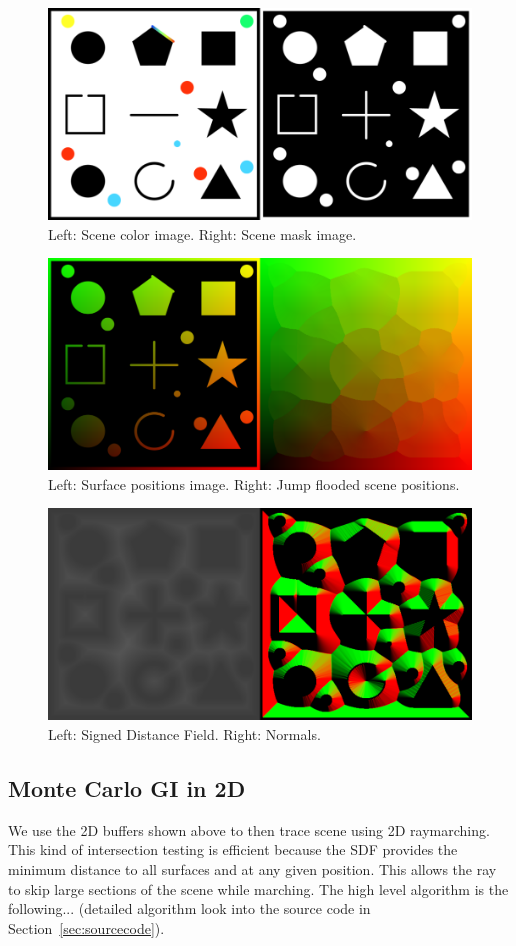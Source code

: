 \documentclass[acmtog, nonacm]{acmart}
\begin{document}
\begin{figure}[ht]
  \centering
    \includegraphics[width=0.7\linewidth]{scene_description.png}
    \caption{Left: Scene color image. Right: Scene mask image.}
\end{figure}

\begin{figure}[ht]
  \centering
    \includegraphics[width=0.7\linewidth]{jfa.png}
    \caption{Left: Surface positions image. Right: Jump flooded scene positions.}
\end{figure}

\begin{figure}[ht]
  \centering
    \includegraphics[width=0.7\linewidth]{sdf_norm.png}
    \caption{Left: Signed Distance Field. Right: Normals.}
\end{figure}

\break


\subsection{Monte Carlo GI in 2D}
We use the 2D buffers shown above to then trace scene using 2D raymarching. This kind of intersection testing is efficient because the SDF provides the minimum distance to all surfaces and at any given position. This allows the ray to skip large sections of the scene while marching. The high level algorithm is the following... (detailed algorithm look into the source code in Section~\ref{sec:sourcecode}).
\end{document}
